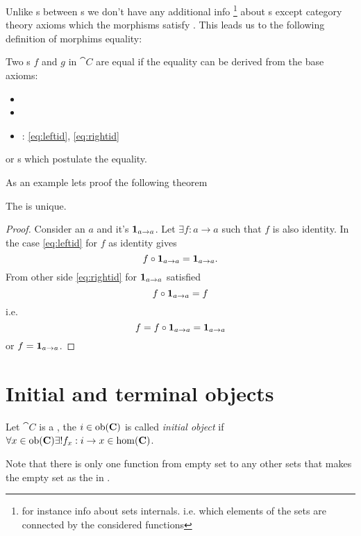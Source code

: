 Unlike s between s we don't
have any additional info 
\footnote{
for instance info about sets internals. i.e. which elements of the sets
are connected by the considered functions
}
about s except
category theory axioms which the morphisms satisfy 
\cite{bib:stackexchange:morphism:equality}. This leads us to the
following definition of morphims equality:
\begin{definition}
\label{def:morphism_equality}
Two s $f$ and $g$ in 
$\cat{C}$ are equal if the equality can be derived from the base axioms: 
\begin{itemize}
\item {}
\item {}
\item {}: \eqref{eq:leftid}, \eqref{eq:rightid}
\end{itemize}
or s which postulate the equality.
\end{definition}
As an example lets proof the following theorem
\begin{theorem}
\label{thm:identity_unique}
The  is unique.
\begin{proof}
Consider an  $a$ and it's  
$\mathbf{1}_{ a \to a }$. Let $\exists f: a \to a$ such that $f$ is also
identity. In the case \eqref{eq:leftid} for $f$ as identity gives
\[
f \circ \mathbf{1}_{ a \to a } = \mathbf{1}_{ a \to a }.
\]
From other side \eqref{eq:rightid} for $\mathbf{1}_{ a \to a }$ satisfied
\[
f \circ \mathbf{1}_{ a \to a } = f
\]
i.e.
\[
f = f \circ \mathbf{1}_{ a \to a } = \mathbf{1}_{ a \to a }
\] 
or
$f = \mathbf{1}_{ a \to a }$.
\end{proof}
\end{theorem}

\section{Initial and terminal objects}
\begin{definition}
\label{def:initial_object}
Let $\cat{C}$ is a , the
 $i \in \mathrm{ob}(\mathbf{C})$ is called
\textit{initial object} if $\forall x \in \mathrm{ob}(\mathbf{C})
\exists! f_x: i \to x \in \mathrm{hom}(\mathbf{C})$.
\end{definition}

\begin{example}
\label{ex:set_initial_object}
Note that there is only one function from empty set to any other sets
\cite{bib:proofwiki:Empty_Mapping_is_Unique} that makes the empty set
as the  in . 
\end{example}

